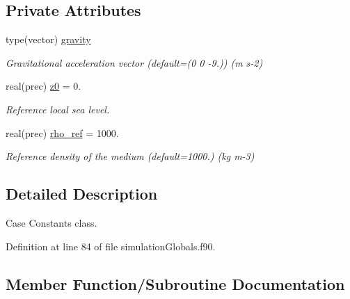 \subsection*{Private Attributes}
\begin{DoxyCompactItemize}
\item 
type(vector) \mbox{\hyperlink{structsimulationglobals__mod_1_1constants__t_abe210fea4268af42f1cb950a1e3b3cfd}{gravity}}
\begin{DoxyCompactList}\small\item\em Gravitational acceleration vector (default=(0 0 -\/9.)) (m s-\/2) \end{DoxyCompactList}\item 
real(prec) \mbox{\hyperlink{structsimulationglobals__mod_1_1constants__t_a9dab4143c1d5fd54c8337d78ea9b7d82}{z0}} = 0.
\begin{DoxyCompactList}\small\item\em Reference local sea level. \end{DoxyCompactList}\item 
real(prec) \mbox{\hyperlink{structsimulationglobals__mod_1_1constants__t_ac466093200262cde2551525b04809d3a}{rho\+\_\+ref}} = 1000.
\begin{DoxyCompactList}\small\item\em Reference density of the medium (default=1000.) (kg m-\/3) \end{DoxyCompactList}\end{DoxyCompactItemize}


\subsection{Detailed Description}
Case Constants class. 

Definition at line 84 of file simulation\+Globals.\+f90.



\subsection{Member Function/\+Subroutine Documentation}
\mbox{\label{structsimulationglobals__mod_1_1constants__t_a287a252cb5c736b4da24d79cf9c59897}} 
